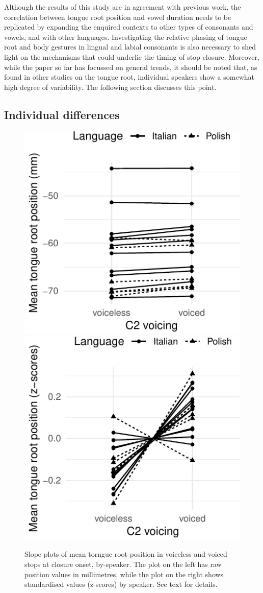 \documentclass[12pt,]{article}
\begin{document}
Although the results of this study are in agreement with previous work,
the correlation between tongue root position and vowel duration needs to
be replicated by expanding the enquired contexts to other types of
consonants and vowels, and with other languages. Investigating the
relative phasing of tongue root and body gestures in lingual and labial
consonants is also necessary to shed light on the mechanisms that could
underlie the timing of stop closure. Moreover, while the paper so far
has focussed on general trends, it should be noted that, as found in
other studies on the tongue root, individual speakers show a somewhat
high degree of variability. The following section discusses this point.

\hypertarget{individual-differences}{%
\subsection{Individual differences}\label{individual-differences}}

\label{s:idio}

\begin{figure}

{\centering \includegraphics[width=.49\linewidth]{2018-tra_files/figure-latex/trp-voicing-plot-1} \includegraphics[width=.49\linewidth]{2018-tra_files/figure-latex/trp-voicing-plot-2} 

}

\caption{Slope plots of mean torngue root position in voiceless and voiced stops at closure onset, by-speaker. The plot on the left has raw position values in millimetres, while the plot on the right shows standardised values (z-scores) by speaker. See text for details.}\label{f:trp-voicing-plot}
\end{figure}
\end{document}
